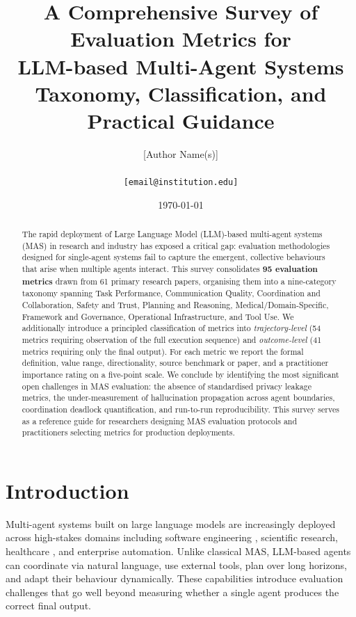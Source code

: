 \documentclass[11pt,a4paper]{article}
\title{%
  \textbf{A Comprehensive Survey of Evaluation Metrics for}\\
  \textbf{LLM-based Multi-Agent Systems}\\[6pt]
  \large Taxonomy, Classification, and Practical Guidance
}
\author{%
  [Author Name(s)]\\
  [Institution(s)]\\
  \texttt{[email@institution.edu]}
}
\date{\today}
\begin{document}
\maketitle

\begin{abstract}
The rapid deployment of Large Language Model (LLM)-based multi-agent systems (MAS)
in research and industry has exposed a critical gap: evaluation methodologies designed
for single-agent systems fail to capture the emergent, collective behaviours that arise
when multiple agents interact. This survey consolidates \textbf{95 evaluation metrics}
drawn from 61 primary research papers, organising them into a nine-category taxonomy
spanning Task Performance, Communication Quality, Coordination and Collaboration,
Safety and Trust, Planning and Reasoning, Medical/Domain-Specific, Framework and
Governance, Operational Infrastructure, and Tool Use. We additionally introduce a
principled classification of metrics into \emph{trajectory-level} (54 metrics requiring
observation of the full execution sequence) and \emph{outcome-level} (41 metrics
requiring only the final output). For each metric we report the formal definition,
value range, directionality, source benchmark or paper, and a practitioner importance
rating on a five-point scale. We conclude by identifying the most significant open
challenges in MAS evaluation: the absence of standardised privacy leakage metrics,
the under-measurement of hallucination propagation across agent boundaries,
coordination deadlock quantification, and run-to-run reproducibility. This survey
serves as a reference guide for researchers designing MAS evaluation protocols
and practitioners selecting metrics for production deployments.
\end{abstract}

\tableofcontents
\newpage

\section{Introduction}
\label{sec:intro}

Multi-agent systems built on large language models are increasingly deployed across
high-stakes domains including software engineering \citep{swe_bench2024}, scientific
research, healthcare \citep{medaide2024}, and enterprise automation. Unlike classical
MAS, LLM-based agents can coordinate via natural language, use external tools, plan
over long horizons, and adapt their behaviour dynamically. These capabilities introduce
evaluation challenges that go well beyond measuring whether a single agent produces the
correct final output.
\end{document}
